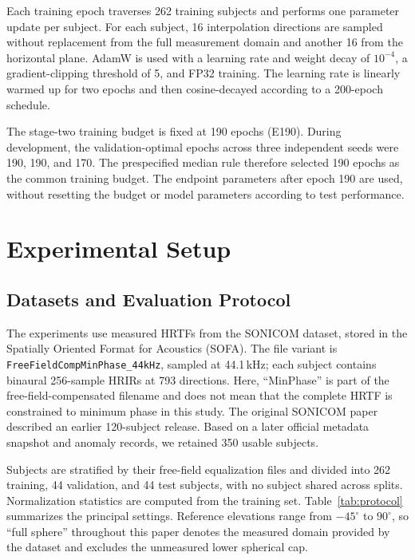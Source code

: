 \documentclass[UTF8,a4paper]{article}
\begin{document}
Each training epoch traverses 262 training subjects and performs one parameter update per subject. For each subject, 16 interpolation directions are sampled without replacement from the full measurement domain and another 16 from the horizontal plane. AdamW is used with a learning rate and weight decay of $10^{-4}$, a gradient-clipping threshold of 5, and FP32 training. The learning rate is linearly warmed up for two epochs and then cosine-decayed according to a 200-epoch schedule.

The stage-two training budget is fixed at 190 epochs (E190). During development, the validation-optimal epochs across three independent seeds were 190, 190, and 170. The prespecified median rule therefore selected 190 epochs as the common training budget. The endpoint parameters after epoch 190 are used, without resetting the budget or model parameters according to test performance.

\section{Experimental Setup}
\label{sec:setup}

\subsection{Datasets and Evaluation Protocol}

The experiments use measured HRTFs from the SONICOM dataset\cite{R6}, stored in the Spatially Oriented Format for Acoustics (SOFA)\cite{R8}. The file variant is \texttt{FreeFieldCompMinPhase\_44kHz}, sampled at 44.1\,kHz; each subject contains binaural 256-sample HRIRs at 793 directions. Here, ``MinPhase'' is part of the free-field-compensated filename and does not mean that the complete HRTF is constrained to minimum phase in this study. The original SONICOM paper described an earlier 120-subject release. Based on a later official metadata snapshot and anomaly records, we retained 350 usable subjects.

Subjects are stratified by their free-field equalization files and divided into 262 training, 44 validation, and 44 test subjects, with no subject shared across splits. Normalization statistics are computed from the training set. Table~\ref{tab:protocol} summarizes the principal settings. Reference elevations range from $-45^\circ$ to $90^\circ$, so ``full sphere'' throughout this paper denotes the measured domain provided by the dataset and excludes the unmeasured lower spherical cap.
\end{document}
